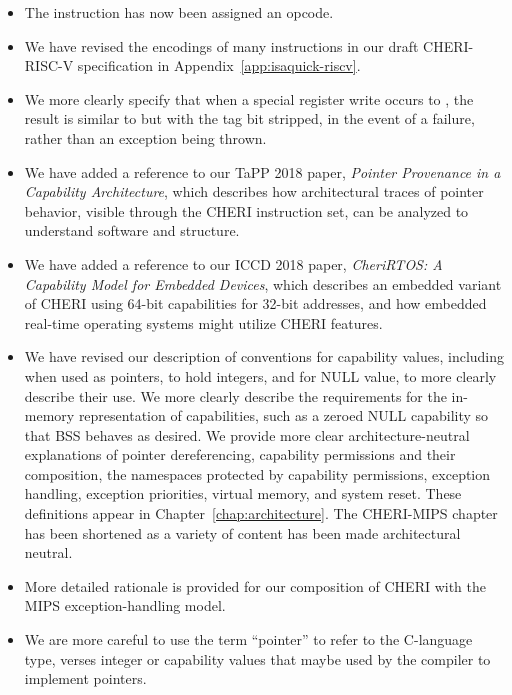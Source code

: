 \begin{itemize}
\item The instruction  has now been assigned an opcode.

\item We have revised the encodings of many instructions in our draft
  CHERI-RISC-V specification in Appendix~\ref{app:isaquick-riscv}.

\item We more clearly specify that when a special register write occurs to
  \EPC{}, the result is similar to  but with the tag
  bit stripped, in the event of a failure, rather than an exception being
  thrown.

\item We have added a reference to our TaPP 2018 paper, \textit{Pointer
  Provenance in a Capability Architecture}, which describes how architectural
  traces of pointer behavior, visible through the CHERI instruction set, can
  be analyzed to understand software and structure.

\item We have added a reference to our ICCD 2018 paper, \textit{CheriRTOS:
  A Capability Model for Embedded Devices}, which describes an embedded
  variant of CHERI using 64-bit capabilities for 32-bit addresses, and how
  embedded real-time operating systems might utilize CHERI features.

\item We have revised our description of conventions for capability values,
  including when used as pointers, to hold integers, and for NULL value, to
  more clearly describe their use.
  We more clearly describe the requirements for the in-memory
  representation of capabilities, such as a zeroed NULL capability so that
  BSS behaves as desired.
  We provide more clear architecture-neutral explanations of pointer
  dereferencing, capability
  permissions and their composition, the namespaces protected by capability
  permissions, exception handling, exception priorities, virtual memory, and
  system reset.
  These definitions appear in Chapter~\ref{chap:architecture}.
  The CHERI-MIPS chapter has been
  shortened as a variety of content has been made architectural neutral.

\item More detailed rationale is provided for our composition of CHERI with
  the MIPS exception-handling model.

\item We are more careful to use the term ``pointer'' to refer to the
  C-language type, verses integer or capability values that maybe used by the
  compiler to implement pointers.


\end{itemize}

